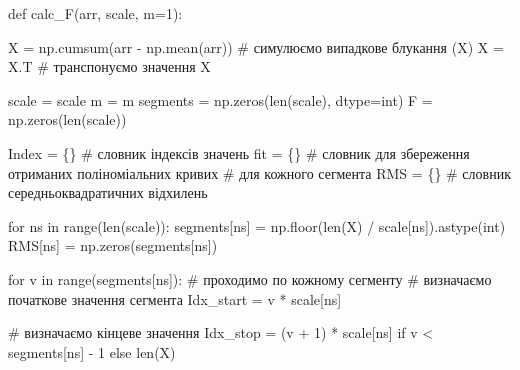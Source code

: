 \documentclass[
  letterpaper,
]{report}
\newenvironment{Shaded}{\begin{snugshade}}{\end{snugshade}}
\newcommand{\BuiltInTok}[1]{\textcolor[rgb]{0.00,0.23,0.31}{#1}}
\newcommand{\CommentTok}[1]{\textcolor[rgb]{0.37,0.37,0.37}{#1}}
\newcommand{\ControlFlowTok}[1]{\textcolor[rgb]{0.00,0.23,0.31}{#1}}
\newcommand{\DecValTok}[1]{\textcolor[rgb]{0.68,0.00,0.00}{#1}}
\newcommand{\KeywordTok}[1]{\textcolor[rgb]{0.00,0.23,0.31}{#1}}
\newcommand{\NormalTok}[1]{\textcolor[rgb]{0.00,0.23,0.31}{#1}}
\newcommand{\OperatorTok}[1]{\textcolor[rgb]{0.37,0.37,0.37}{#1}}
\begin{document}
\begin{Shaded}
\begin{Highlighting}[]
\KeywordTok{def}\NormalTok{ calc\_F(arr, scale, m}\OperatorTok{=}\DecValTok{1}\NormalTok{):}
    
\NormalTok{    X }\OperatorTok{=}\NormalTok{ np.cumsum(arr }\OperatorTok{{-}}\NormalTok{ np.mean(arr)) }\CommentTok{\# симулюємо випадкове блукання (X)}
\NormalTok{    X }\OperatorTok{=}\NormalTok{ X.T                           }\CommentTok{\# транспонуємо значення X}

\NormalTok{    scale }\OperatorTok{=}\NormalTok{ scale}
\NormalTok{    m }\OperatorTok{=}\NormalTok{ m}
\NormalTok{    segments }\OperatorTok{=}\NormalTok{ np.zeros(}\BuiltInTok{len}\NormalTok{(scale), dtype}\OperatorTok{=}\BuiltInTok{int}\NormalTok{)}
\NormalTok{    F }\OperatorTok{=}\NormalTok{ np.zeros(}\BuiltInTok{len}\NormalTok{(scale))}

\NormalTok{    Index }\OperatorTok{=}\NormalTok{ \{\}  }\CommentTok{\# словник індексів значень}
\NormalTok{    fit }\OperatorTok{=}\NormalTok{ \{\}    }\CommentTok{\# словник для збереження отриманих поліноміальних кривих}
                \CommentTok{\# для кожного сегмента}
\NormalTok{    RMS }\OperatorTok{=}\NormalTok{ \{\}    }\CommentTok{\# словник середньоквадратичних відхилень}

    \ControlFlowTok{for}\NormalTok{ ns }\KeywordTok{in} \BuiltInTok{range}\NormalTok{(}\BuiltInTok{len}\NormalTok{(scale)):}
\NormalTok{        segments[ns] }\OperatorTok{=}\NormalTok{ np.floor(}\BuiltInTok{len}\NormalTok{(X) }\OperatorTok{/}\NormalTok{ scale[ns]).astype(}\BuiltInTok{int}\NormalTok{)}
\NormalTok{        RMS[ns] }\OperatorTok{=}\NormalTok{ np.zeros(segments[ns])}

        \ControlFlowTok{for}\NormalTok{ v }\KeywordTok{in} \BuiltInTok{range}\NormalTok{(segments[ns]):         }\CommentTok{\# проходимо по кожному сегменту}
            \CommentTok{\# визначаємо початкове значення сегмента}
\NormalTok{            Idx\_start }\OperatorTok{=}\NormalTok{ v }\OperatorTok{*}\NormalTok{ scale[ns]  }
                       
            \CommentTok{\# визначаємо кінцеве значення}
\NormalTok{            Idx\_stop }\OperatorTok{=}\NormalTok{ (v }\OperatorTok{+} \DecValTok{1}\NormalTok{) }\OperatorTok{*}\NormalTok{ scale[ns] }\ControlFlowTok{if}\NormalTok{ v }\OperatorTok{\textless{}}\NormalTok{ segments[ns] }\OperatorTok{{-}} \DecValTok{1} \ControlFlowTok{else} \BuiltInTok{len}\NormalTok{(X)    }
            

\end{Highlighting}
\end{Shaded}
\end{document}
